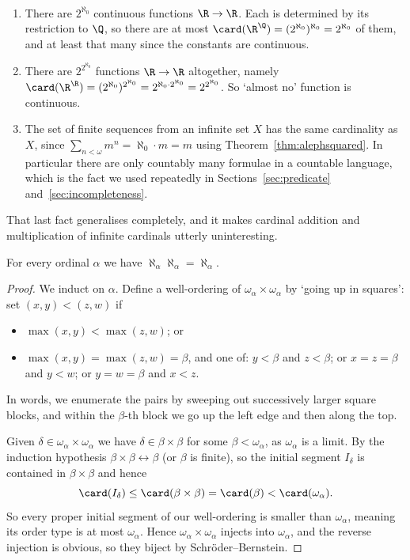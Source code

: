 \begin{example}~
  \begin{enumerate}[label=(\roman*)]
    \item There are $2^{\aleph_0}$ continuous functions $\R \to \R$. Each is determined by its restriction to $\Q$, so there are at most $\card(\R^\Q) = (2^{\aleph_0})^{\aleph_0} = 2^{\aleph_0}$ of them, and at least that many since the constants are continuous.
    \item There are $2^{2^{\aleph_0}}$ functions $\R \to \R$ altogether, namely $\card(\R^\R) = (2^{\aleph_0})^{2^{\aleph_0}} = 2^{\aleph_0 \cdot 2^{\aleph_0}} = 2^{2^{\aleph_0}}$. So `almost no' function is continuous.
    \item The set of finite sequences from an infinite set $X$ has the same cardinality as $X$, since $\sum_{n < \omega} m^n = \aleph_0 \cdot m = m$ using Theorem~\ref{thm:alephsquared}. In particular there are only countably many formulae in a countable language, which is the fact we used repeatedly in Sections~\ref{sec:predicate} and~\ref{sec:incompleteness}.
  \end{enumerate}
\end{example}

That last fact generalises completely, and it makes cardinal addition and multiplication of infinite cardinals utterly uninteresting.

\begin{theorem}\label{thm:alephsquared}
  For every ordinal $\alpha$ we have $\aleph_\alpha \aleph_\alpha = \aleph_\alpha$.
\end{theorem}
\begin{proof}
  We induct on $\alpha$. Define a well-ordering of $\omega_\alpha \times \omega_\alpha$ by `going up in squares': set $(x, y) < (z, w)$ if
  \begin{itemize}
    \item $\max(x, y) < \max(z, w)$; or
    \item $\max(x,y) = \max(z,w) = \beta$, and one of: $y < \beta$ and $z < \beta$; or $x = z = \beta$ and $y < w$; or $y = w = \beta$ and $x < z$.
  \end{itemize}
  In words, we enumerate the pairs by sweeping out successively larger square blocks, and within the $\beta$-th block we go up the left edge and then along the top.

  Given $\delta \in \omega_\alpha \times \omega_\alpha$ we have $\delta \in \beta \times \beta$ for some $\beta < \omega_\alpha$, as $\omega_\alpha$ is a limit. By the induction hypothesis $\beta \times \beta \leftrightarrow \beta$ (or $\beta$ is finite), so the initial segment $I_\delta$ is contained in $\beta \times \beta$ and hence
  $$\card(I_\delta) \leq \card(\beta \times \beta) = \card(\beta) < \card(\omega_\alpha).$$
  So every proper initial segment of our well-ordering is smaller than $\omega_\alpha$, meaning its order type is at most $\omega_\alpha$. Hence $\omega_\alpha \times \omega_\alpha$ injects into $\omega_\alpha$, and the reverse injection is obvious, so they biject by Schr\"oder--Bernstein.
\end{proof}

